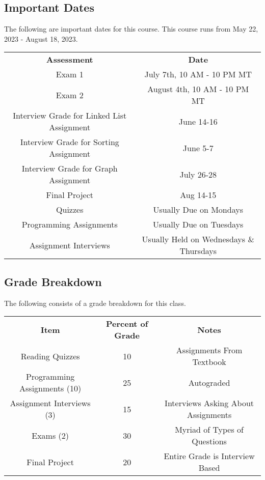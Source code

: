 \subsection{Important Dates}
The following are important dates for this course. This course runs from May 22, 2023 - August 18, 2023.
\begin{table}[ht]
    \centering
    \begin{tabular}{c c}
         \textbf{Assessment} & \textbf{Date} \\
         Exam 1 & July 7th, 10 AM - 10 PM MT \\
         Exam 2 & August 4th, 10 AM - 10 PM MT \\
         Interview Grade for Linked List Assignment & June 14-16 \\
         Interview Grade for Sorting Assignment & June 5-7 \\
         Interview Grade for Graph Assignment & July 26-28 \\
         Final Project & Aug 14-15 \\
         Quizzes & Usually Due on Mondays \\
         Programming Assignments & Usually Due on Tuesdays \\
         Assignment Interviews & Usually Held on Wednesdays \& Thursdays \\
    \end{tabular}
\end{table}
\par \noindent

\subsection{Grade Breakdown}
The following consists of a grade breakdown for this class.
\begin{table}[ht]
    \centering
    \begin{tabular}{c c c}
         \textbf{Item} & \textbf{Percent of Grade} & \textbf{Notes} \\
         Reading Quizzes & 10 & Assignments From Textbook \\
         Programming Assignments (10) & 25 & Autograded \\
         Assignment Interviews (3) & 15 & Interviews Asking About Assignments \\
         Exams (2) & 30 & Myriad of Types of Questions \\
         Final Project & 20 & Entire Grade is Interview Based \\
    \end{tabular}
\end{table}
\par \noindent

